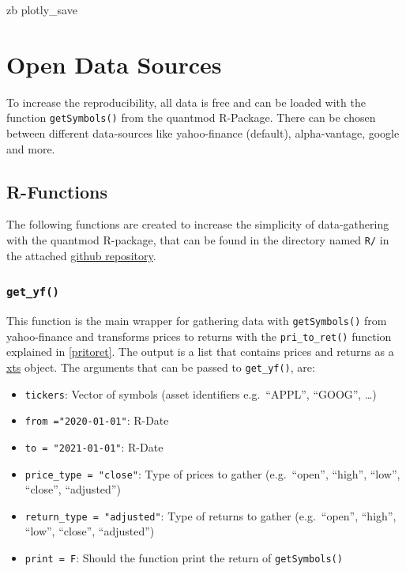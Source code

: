 \documentclass[
  oneside]{book}
\providecommand{\tightlist}{%
  \setlength{\itemsep}{0pt}\setlength{\parskip}{0pt}}
\begin{document}
zb plotly\_save

\hypertarget{open-data-sources}{%
\chapter{Open Data Sources}\label{open-data-sources}}

To increase the reproducibility, all data is free and can be loaded with the function \texttt{getSymbols()} from the quantmod R-Package. There can be chosen between different data-sources like yahoo-finance (default), alpha-vantage, google and more.

\hypertarget{r-functions-1}{%
\section{R-Functions}\label{r-functions-1}}

The following functions are created to increase the simplicity of data-gathering with the quantmod R-package, that can be found in the directory named \texttt{R/} in the attached \href{https://github.com/AxelCode-R/Master-Thesis}{github repository}.

\hypertarget{get_yf}{%
\subsection{\texorpdfstring{\texttt{get\_yf()}}{get\_yf()}}\label{get_yf}}

This function is the main wrapper for gathering data with \texttt{getSymbols()} from yahoo-finance and transforms prices to returns with the \texttt{pri\_to\_ret()} function explained in \ref{pritoret}. The output is a list that contains prices and returns as a \href{https://cran.r-project.org/web/packages/xts/xts.pdf}{xts} object. The arguments that can be passed to \texttt{get\_yf()}, are:

\begin{itemize}
\tightlist
\item
  \texttt{tickers}: Vector of symbols (asset identifiers e.g.~``APPL'', ``GOOG'', \ldots)
\item
  \texttt{from\ ="2020-01-01"}: R-Date
\item
  \texttt{to\ =\ "2021-01-01"}: R-Date
\item
  \texttt{price\_type\ =\ "close"}: Type of prices to gather (e.g.~``open'', ``high'', ``low'', ``close'', ``adjusted'')
\item
  \texttt{return\_type\ =\ "adjusted"}: Type of returns to gather (e.g.~``open'', ``high'', ``low'', ``close'', ``adjusted'')
\item
  \texttt{print\ =\ F}: Should the function print the return of \texttt{getSymbols()}
\end{itemize}
\end{document}
